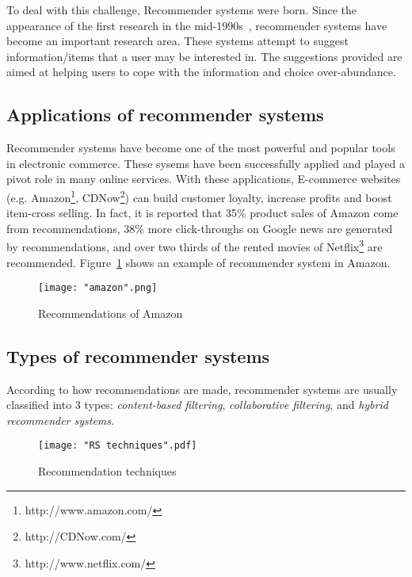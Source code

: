 \documentclass[oneside,13pt]{extreport}
\begin{document}
To deal with this challenge, Recommender systems were born. Since the appearance of the first research in the mid-1990s~\cite{Hill, Resnick, Shardanand}, recommender systems have become an important research area. These systems attempt to suggest information/items that a user may be interested in. The suggestions provided are aimed at helping users to cope with the information and choice over-abundance. 

\subsection{Applications of recommender systems}
Recommender systems have become one of the most powerful and popular tools in electronic commerce. These sysems have been successfully applied and played a pivot role in many online services. With these applications, E-commerce websites (e.g. Amazon\footnote{http://www.amazon.com/}, CDNow\footnote{http://CDNow.com/}) can build customer loyalty, increase profits and boost item-cross selling. In fact, it is reported that 35\% product sales of Amazon come from recommendations, 38\% more click-throughs on Google news are generated by recommendations, and over two thirds of the rented movies of Netflix\footnote{http://www.netflix.com/} are recommended\cite{Chevalier}.
Figure~\ref{fig:amazon} shows an example of recommender system in Amazon.
\begin{figure}[h!]
    \centering
    \texttt{[image: "amazon".png]} 
    \caption{Recommendations of Amazon}
    \label{fig:amazon}
\end{figure}

\subsection{Types of recommender systems}
According to how recommendations are made, recommender systems are usually classified into 3 types\cite{Adomavicius, Balabanovic}: \emph{content-based filtering}, \emph{collaborative filtering}, and \emph{hybrid recommender systems}.

\begin{figure}[h!]
\centering
\texttt{[image: "RS techniques".pdf]}
\caption{Recommendation techniques}
\label{fig:RS_techniques}
\end{figure}
\end{document}
